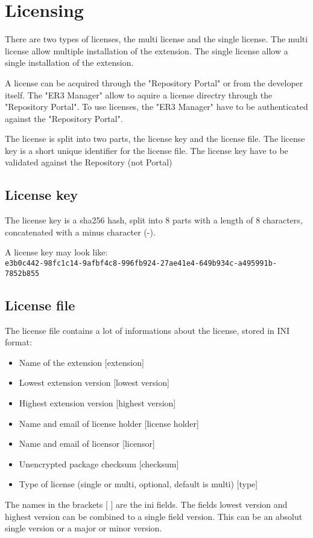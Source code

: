 \label{sec:licensing} 
\chapter{Licensing}

There are two types of licenses, the multi license and the single license.
The multi license allow multiple installation of the extension.
The single license allow a single installation of the extension.

A license can be acquired through the "Repository Portal" or from the developer itself.
The "ER3 Manager" allow to aquire a license directry through the "Repository Portal".
To use licenses, the "ER3 Manager" have to be authenticated against the "Repository Portal".

The license is split into two parts, the license key and the license file.
The license key is a short unique identifier for the license file.
The license key have to be validated against the Repository (not Portal)

\section[sec:license key]{License key}

The license key is a sha256 hash, split into 8 parts with a length of 8 characters, concatenated with a minus character (-).

A license key may look like: \\
\texttt{e3b0c442-98fc1c14-9afbf4c8-996fb924-27ae41e4-649b934c-a495991b-7852b855}

\section[sec:license file]{License file}

The license file contains a lot of informations about the license, stored in INI format:
\begin{itemize}
\item Name of the extension [extension]
\item Lowest extension version [lowest version]
\item Highest extension version [highest version]
\item Name and email of license holder [license holder]
\item Name and email of licensor [licensor]
\item Unencrypted package checksum [checksum]
\item Type of license (single or multi, optional, default is multi) [type]
\end{itemize}
The names in the brackets [ ] are the ini fields.
The fields lowest version and highest version can be combined to a single field version.
This can be an absolut single version or a major or minor version.


